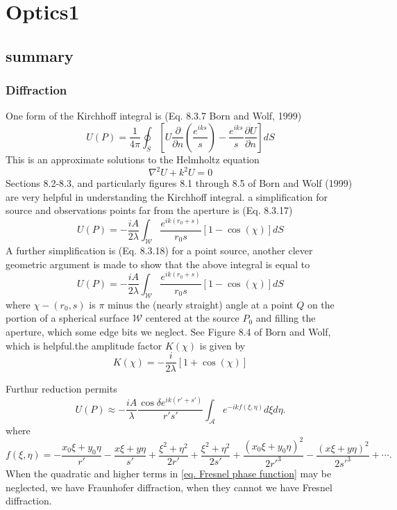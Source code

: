 \documentclass[../../main.tex]{subfiles} %
\begin{document}
\chapter{Optics1}
\section{summary}
\subsection{Diffraction}
One form of the Kirchhoff integral is (Eq. 8.3.7 Born and Wolf, 1999)
\begin{equation} \label{eq. Kirchhoff diffracton integral}
    U(P)=\frac{1}{4\pi}\oint_S\left[U\frac{\partial}{\partial n}\left(\frac{e^{iks}}{s}\right)-\frac{e^{iks}}{s}\frac{\partial U}{\partial n}\right]dS
\end{equation}
This is an approximate solutions to the Helmholtz equation
\begin{equation}
    \nabla^2U+k^2U=0
\end{equation}
Sections 8.2-8.3, and particularly figures 8.1 through 8.5 of Born and Wolf (1999) are very helpful in understanding the Kirchhoff integral. a simplification for source and observations points far from the aperture is (Eq. 8.3.17)
\begin{equation} 
    U(P)=-\frac{iA}{2\lambda}\int_{\mathcal{W}}\frac{e^{ik(r_0+s)}}{r_0s}[1-\cos(\chi)]dS
\end{equation}
A further simplification is (Eq. 8.3.18) for a point source, another clever geometric argument is made to show that the above integral is equal to
\begin{equation} 
    U(P)=-\frac{iA}{2\lambda}\int_{\mathcal{W}}\frac{e^{ik(r_0+s)}}{r_0s}[1-\cos(\chi)]dS
\end{equation}
where $\chi-(r_0,s)$ is $\pi$ minus the (nearly straight) angle at a point $Q$ on the portion of a spherical surface $\mathcal{W}$  centered at the source $P_0$ and filling the aperture, which some edge bits we neglect. See Figure 8.4 of Born and Wolf, which is helpful.the amplitude factor $K(\chi)$ is given by 
\begin{equation} 
    K(\chi)=-\frac{i}{2\lambda}[1+\cos(\chi)]
\end{equation}

Furthur reduction permits 
\begin{equation} \label{eq. Kirchoff integral Fresnel Fraunhofer form}
    U(P)\approx-\frac{iA}{\lambda}\frac{\cos\delta e^{ik(r'+s')}}{r's'}\int_{\mathcal{A}}e^{-ikf(\xi,\eta)}d\xi d\eta.
\end{equation}
where
\begin{equation} \label{eq. Fresnel phase function}
    f(\xi,\eta)=-\frac{x_0\xi+y_0\eta}{r'}-\frac{x\xi+y\eta}{s'}+\frac{\xi^2+\eta^2}{2r'}+\frac{\xi^2+\eta^2}{2s'}+\frac{(x_0\xi+y_0\eta)^2}{2r'^3}-\frac{(x\xi+y\eta)^2}{2s'^3}+\cdots.
\end{equation}
When the quadratic and higher terms in \ref{eq. Fresnel phase function} may be neglected, we have Fraunhofer diffraction, when they cannot we have Fresnel diffraction. 
\end{document}

